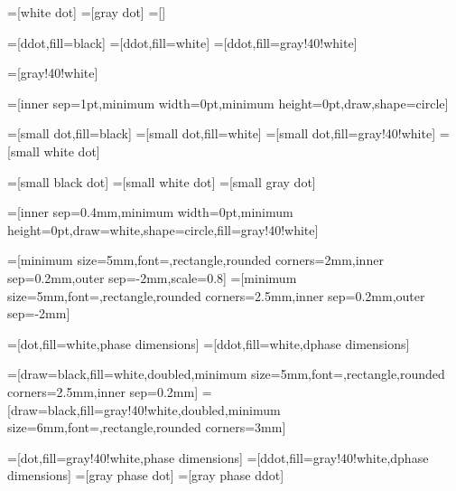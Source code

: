 =[white dot]
=[gray dot]
=[]


=[ddot,fill=black]
=[ddot,fill=white]
=[ddot,fill=gray!40!white]

=[gray!40!white]


=[inner sep=1pt,minimum width=0pt,minimum height=0pt,draw,shape=circle]

=[small dot,fill=black]
=[small dot,fill=white]
=[small dot,fill=gray!40!white]
 = [small white dot]

=[small black dot]
=[small white dot]
=[small gray dot]

=[inner sep=0.4mm,minimum width=0pt,minimum height=0pt,draw=white,shape=circle,fill=gray!40!white]


=[minimum size=5mm,font=\footnotesize,rectangle,rounded corners=2mm,inner sep=0.2mm,outer sep=-2mm,scale=0.8]
=[minimum size=5mm,font=\footnotesize,rectangle,rounded corners=2.5mm,inner sep=0.2mm,outer sep=-2mm]

=[dot,fill=white,phase dimensions]
=[ddot,fill=white,dphase dimensions]

=[draw=black,fill=white,doubled,minimum size=5mm,font=\footnotesize,rectangle,rounded corners=2.5mm,inner sep=0.2mm]
=[draw=black,fill=gray!40!white,doubled,minimum size=6mm,font=\footnotesize,rectangle,rounded corners=3mm]

=[dot,fill=gray!40!white,phase dimensions]
=[ddot,fill=gray!40!white,dphase dimensions]
=[gray phase dot]
=[gray phase ddot]

